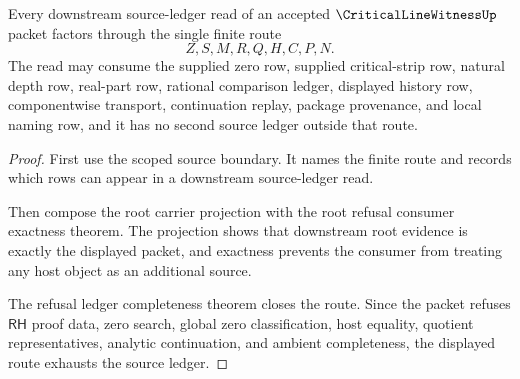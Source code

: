 \begin{theorem}
\label{thm:critical-line-witness-source-ledger-exhaustion}
Every downstream source-ledger read of an accepted $\CriticalLineWitnessUp$ packet factors through the single finite route
$$
Z,S,M,R,Q,H,C,P,N.
$$
The read may consume the supplied zero row, supplied critical-strip row, natural depth row, real-part row, rational comparison ledger, displayed history row, componentwise transport, continuation replay, package provenance, and local naming row, and it has no second source ledger outside that route.
\end{theorem}
\begin{proof}
First use the scoped source boundary. It names the finite route and records which rows can appear in a downstream source-ledger read.

Then compose the root carrier projection with the root refusal consumer exactness theorem. The projection shows that downstream root evidence is exactly the displayed packet, and exactness prevents the consumer from treating any host object as an additional source.

The refusal ledger completeness theorem closes the route. Since the packet refuses $\mathsf{RH}$ proof data, zero search, global zero classification, host equality, quotient representatives, analytic continuation, and ambient completeness, the displayed route exhausts the source ledger.
\end{proof}

